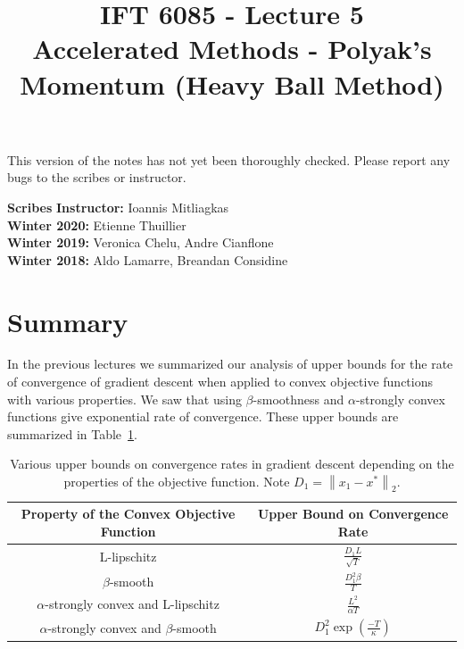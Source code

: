 \documentclass{article}
\title{IFT 6085 - Lecture 5 \\ 
Accelerated Methods - Polyak's Momentum (Heavy Ball Method) }
\date{}
\newcommand\norm[1]{\left\lVert#1\right\rVert}
\begin{document}
 

\maketitle

\vspace{-0.5in}
\begin{center}
This version of the notes has not yet been thoroughly checked.
Please report any bugs to the scribes or instructor.
\end{center}
\vspace{0.2in}

\textbf{Scribes}\hfill
\textbf{Instructor:}  Ioannis Mitliagkas\\
\textbf{Winter 2020:} Etienne Thuillier\\
\textbf{Winter 2019:} Veronica Chelu, Andre Cianflone\\
\textbf{Winter 2018:} Aldo Lamarre, Breandan Considine



\newcommand{\infgc}{\inf_{g \in \mathcal{C}}}
\newcommand{\supgc}{\sup_{g \in \mathcal{C}}}

\newcommand{\Prob}{\mathbb{P}}
\newcommand{\E}{\mathbb{E}}
\newcommand{\reals}{\mathbb{R}}


\section{Summary}

In the previous lectures we summarized our analysis of upper bounds for the rate of convergence of gradient descent when applied to convex objective functions with various properties. We saw that using $\beta$-smoothness and $\alpha$-strongly convex  functions give exponential rate of convergence.  These upper bounds are summarized in Table~\ref{tab:upper_bounds}.

\begin{table}[H]
\centering
    {\renewcommand{\arraystretch}{2.0}
    \begin{tabular}{|c|c|}\hline
		Property of the Convex Objective Function & Upper Bound on Convergence Rate \\\hline
		L-lipschitz & $ \frac{D_1 L}{\sqrt{T}}$\\\hline
		$\beta$-smooth & $ \frac{D^2_1 \beta}{T}$\\\hline
		$\alpha$-strongly convex and L-lipschitz & $ \frac{L^2}{\alpha T}$\\\hline
		$\alpha$-strongly convex and $\beta$-smooth & $ D^2_1 \exp({\frac{-T}{\kappa}})$\\\hline
	\end{tabular}
	}
\caption{Various upper bounds on convergence rates in gradient descent depending on the properties of the objective function. Note $D_1 = \norm{x_1 - x^*}_2$.}
\label{tab:upper_bounds}
\end{table}
\end{document}
